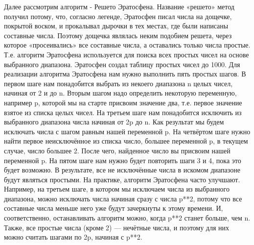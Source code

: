\documentclass[fontsize=14bp]{report}
\begin{document}
Далее рассмотрим алгоритм - Решето Эратосфена.
Название «решето» метод получил потому, что, согласно легенде, Эратосфен писал числа на дощечке, покрытой воском, и прокалывал дырочки в тех местах, где были написаны составные числа. Поэтому дощечка являлась неким подобием решета, через которое «просеивались» все составные числа, а оставались только числа простые. Т.е. алгоритм Эратосфена используется для поиска всех простых чисел на основе выбранного диапазона. Эратосфен создал таблицу простых чисел до 1000.
Для реализации алгоритма Эратосфена нам нужно выполнить пять простых шагов. В первом шаге нам понадобится выбрать из некоего диапазона n целых чисел, начиная от 2 и до n. Вторым шагом надо определить некоторую переменную, например p, которой мы на старте присвоим значение два, т.е. первое значение взятое из списка целых чисел. На третьем шаге нам понадобится исключить из выбранного диапазона числа начиная от 2p до n. Как результат мы будем исключать числа с шагом равным нашей переменной p. На четвёртом шаге нужно найти первое неисключённое из списка число, большее переменной p, в текущем случае, число большее 2. После чего, найденное число вы присвоим нашей переменной p. На пятом шаге нам нужно будет повторить шаги 3 и 4, пока это будет возможно. В результате, все не исключённые числа в искомом диапазоне будут являться простыми.
На практике, алгоритм Эратосфена часто улучшают. Например, на третьем шаге, в котором мы исключаем числа из выбранного диапазона, можно исключать числа начиная сразу с числа p**2, потому что все составные числа меньше него уже будут зачеркнуты к этому времени. И, соответственно, останавливать алгоритм можно, когда p**2 станет больше, чем n. Также, все простые числа (кроме 2) — нечётные числа, и поэтому для них можно считать шагами по 2p, начиная с p**2.
\end{document}
